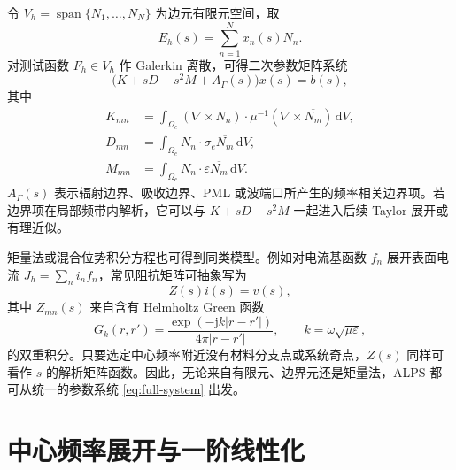 \documentclass[UTF8,a4paper,11pt]{ctexart}
\newcommand{\dd}{\mathrm{d}}
\newcommand{\jj}{\mathrm{j}}
\begin{document}
令 $V_h=\operatorname{span}\{N_1,\ldots,N_N\}$ 为边元有限元空间，取
\[
    E_h(s)=\sum_{n=1}^N x_n(s)N_n .
\]
对测试函数 $F_h\in V_h$ 作 Galerkin 离散，可得二次参数矩阵系统
\begin{equation}
    \bigl(K+sD+s^2M+A_{\Gamma}(s)\bigr)x(s)=b(s),
    \label{eq:fem-quadratic}
\end{equation}
其中
\begin{align}
    K_{mn} &=
    \int_{\Omega_e}(\nabla\times N_n)\cdot\mu^{-1}(\nabla\times\overline{N_m})\,\dd V,\\
    D_{mn} &=
    \int_{\Omega_e}N_n\cdot\sigma_e\overline{N_m}\,\dd V,\\
    M_{mn} &=
    \int_{\Omega_e}N_n\cdot\varepsilon\overline{N_m}\,\dd V .
\end{align}
$A_{\Gamma}(s)$ 表示辐射边界、吸收边界、PML 或波端口所产生的频率相关边界项。若边界项在局部频带内解析，它可以与 $K+sD+s^2M$ 一起进入后续 Taylor 展开或有理近似。

矩量法或混合位势积分方程也可得到同类模型。例如对电流基函数 $f_n$ 展开表面电流 $J_h=\sum_n i_n f_n$，常见阻抗矩阵可抽象写为
\begin{equation}
    Z(s)i(s)=v(s),
    \label{eq:mom-system}
\end{equation}
其中 $Z_{mn}(s)$ 来自含有 Helmholtz Green 函数
\[
    G_k(r,r')=\frac{\exp(-\jj k|r-r'|)}{4\pi |r-r'|},
    \qquad k=\omega\sqrt{\mu\varepsilon},
\]
的双重积分。只要选定中心频率附近没有材料分支点或系统奇点，$Z(s)$ 同样可看作 $s$ 的解析矩阵函数。因此，无论来自有限元、边界元还是矩量法，ALPS 都可从统一的参数系统 \eqref{eq:full-system} 出发。

\section{中心频率展开与一阶线性化}
\end{document}
